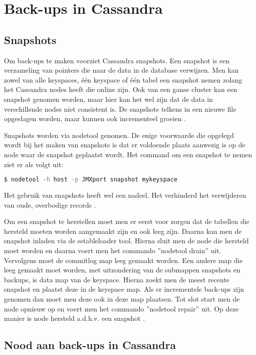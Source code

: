 \chapter{Back-ups in Cassandra}
\label{ch:cassandra_backups}

\section{Snapshots}
Om back-ups te maken voorziet Cassandra snapshots.
Een snapshot is een verzameling van pointers die naar de data in de database verwijzen.
Men kan zowel van alle keyspaces, één keyspace of één tabel een snapshot nemen zolang het Cassandra nodes heeft die online zijn.
Ook van een ganse cluster kan een snapshot genomen worden, maar hier kan het wel zijn dat de data in verschillende nodes niet consistent is.
De snapshots telkens in een nieuwe file opgeslagen worden, maar kunnen ook incrementeel groeien \citep{DataStax2016Snapshot}.

Snapshots worden via nodetool genomen.
De enige voorwaarde die opgelegd wordt bij het maken van snapshots is dat er voldoende plaats aanwezig is op de node waar de snapshot geplaatst wordt.
Het command om een snapshot te nemen ziet er als volgt uit:

\begin{lstlisting}[language=Bash, breaklines=true]
$ nodetool -h host -p JMXport snapshot mykeyspace
\end{lstlisting}

Het gebruik van snapshots heeft wel een nadeel.
Het verhinderd het verwijderen van oude, overbodige records \citep{DataStax2016Snapshot}.

Om een snapshot te herstellen moet men er eerst voor zorgen dat de tabellen die hersteld moeten worden aangemaakt zijn en ook leeg zijn.
Daarna kan men de snapshot inladen via de sstableloader tool.
Hierna sluit men de node die hersteld moet worden en daarna voert men het commando ''nodetool drain'' uit.
Vervolgens moet de commitlog map leeg gemaakt worden.
Een andere map die leeg gemaakt moet worden, met uitzondering van de submappen snapshots en backups, is data map van de keyspace.
Hierna zoekt men de meest recente snapshot en plaatst deze in de keyspace map.
Als er incrementele back-ups zijn genomen dan moet men deze ook in deze map plaatsen.
Tot slot start men de node opnieuw op en voert men het commando ''nodetool repair'' uit.
Op deze manier is node hersteld a.d.h.v. een snapshot \citep{DataStax2016Snapshot}.

\section{Nood aan back-ups in Cassandra}
